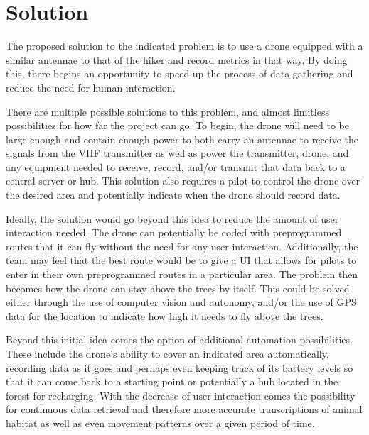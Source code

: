 \documentclass{article}
\begin{document}
\section{Solution}
The proposed solution to the indicated problem is to use a drone equipped with a similar antennae to that of the hiker and record metrics in that way. By doing this, there begins an opportunity to speed up the process of data gathering and reduce the need for human interaction.

There are multiple possible solutions to this problem, and almost limitless possibilities for how far the project can go. To begin, the drone will need to be large enough and contain enough power to both carry an antennae to receive the signals from the VHF transmitter as well as power the transmitter, drone, and any equipment needed to receive, record, and/or transmit that data back to a central server or hub. This solution also requires a pilot to control the drone over the desired area and potentially indicate when the drone should record data.

Ideally, the solution would go beyond this idea to reduce the amount of user interaction needed. The drone can potentially be coded with preprogrammed routes that it can fly without the need for any user interaction. Additionally, the team may feel that the best route would be to give a UI that allows for pilots to enter in their own preprogrammed routes in a particular area. The problem then becomes how the drone can stay above the trees by itself. This could be solved either through the use of computer vision and autonomy, and/or the use of GPS data for the location to indicate how high it needs to fly above the trees.

Beyond this initial idea comes the option of additional automation possibilities. These include the drone's ability to cover an indicated area automatically, recording data as it goes and perhaps even keeping track of its battery levels so that it can come back to a starting point or potentially a hub located in the forest for recharging. With the decrease of user interaction comes the possibility for continuous data retrieval and therefore more accurate transcriptions of animal habitat as well as even movement patterns over a given period of time.

\end{document}
